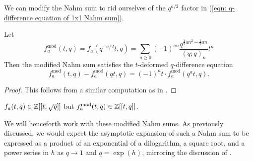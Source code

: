 We can modify the Nahm sum to rid ourselves of the $q^{a/2}$ factor in (\ref{eqn: q-difference equation of 1x1 Nahm sum}).
\begin{corollary}\label{corr: q-difference equation of modified 1x1 Nahm sum}
    Let 
    $$f_{a}^{\mathrm{mod}}(t,q)=f_{a}(q^{-a/2}t,q)=\sum_{n\geq0}(-1)^{an}\frac{q^{\frac{1}{2}an^{2}-\frac{1}{2}an}}{(q;q)_{n}}t^{n}$$
    Then the modified Nahm sum satisfies the $t$-deformed $q$-difference equation 
    \begin{equation}\label{eqn: q-difference equation of modified 1x1 Nahm sum}
        f_{a}^{\mathrm{mod}}(t,q) - f_{a}^{\mathrm{mod}}(qt,q) = (-1)^{a}t\cdot f_{a}^{\mathrm{mod}}(q^{a}t,q).
    \end{equation}
\end{corollary}
\begin{proof}
    This follows from a similar computation as in . 
\end{proof}
\begin{remark}
    $f_{a}(t,q)\in\mathbb{Z}[[t,\sqrt{q}]]$ but $f_{a}^{\mathrm{mod}}(t,q)\in\mathbb{Z}[[t,q]]$. 
\end{remark}
We will henceforth work with these modified Nahm sums. As previously discussed, we would expect the asymptotic expansion of such a Nahm sum to be expressed as a product of an exponential of a dilogarithm, a square root, and a power series in $h$ as $q\to 1$ and $q=\exp(h)$, mirroring the discussion of . 

